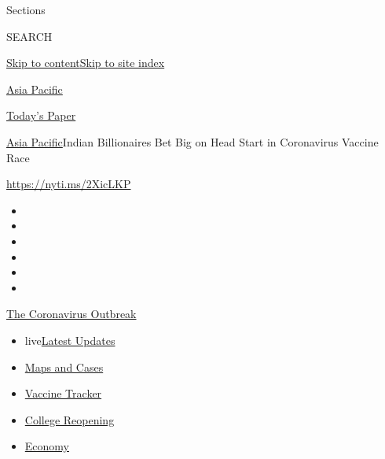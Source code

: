 Sections

SEARCH

\protect\hyperlink{site-content}{Skip to
content}\protect\hyperlink{site-index}{Skip to site index}

\href{https://www.nytimes3xbfgragh.onion/section/world/asia}{Asia
Pacific}

\href{https://myaccount.nytimes3xbfgragh.onion/auth/login?response_type=cookie\&client_id=vi}{}

\href{https://www.nytimes3xbfgragh.onion/section/todayspaper}{Today's
Paper}

\href{/section/world/asia}{Asia Pacific}\textbar{}Indian Billionaires
Bet Big on Head Start in Coronavirus Vaccine Race

\url{https://nyti.ms/2XicLKP}

\begin{itemize}
\item
\item
\item
\item
\item
\item
\end{itemize}

\href{https://www.nytimes3xbfgragh.onion/news-event/coronavirus?action=click\&pgtype=Article\&state=default\&region=TOP_BANNER\&context=storylines_menu}{The
Coronavirus Outbreak}

\begin{itemize}
\tightlist
\item
  live\href{https://www.nytimes3xbfgragh.onion/2020/08/03/world/coronavirus-covid-19.html?action=click\&pgtype=Article\&state=default\&region=TOP_BANNER\&context=storylines_menu}{Latest
  Updates}
\item
  \href{https://www.nytimes3xbfgragh.onion/interactive/2020/us/coronavirus-us-cases.html?action=click\&pgtype=Article\&state=default\&region=TOP_BANNER\&context=storylines_menu}{Maps
  and Cases}
\item
  \href{https://www.nytimes3xbfgragh.onion/interactive/2020/science/coronavirus-vaccine-tracker.html?action=click\&pgtype=Article\&state=default\&region=TOP_BANNER\&context=storylines_menu}{Vaccine
  Tracker}
\item
  \href{https://www.nytimes3xbfgragh.onion/2020/08/02/us/covid-college-reopening.html?action=click\&pgtype=Article\&state=default\&region=TOP_BANNER\&context=storylines_menu}{College
  Reopening}
\item
  \href{https://www.nytimes3xbfgragh.onion/live/2020/08/03/business/stock-market-today-coronavirus?action=click\&pgtype=Article\&state=default\&region=TOP_BANNER\&context=storylines_menu}{Economy}
\end{itemize}

